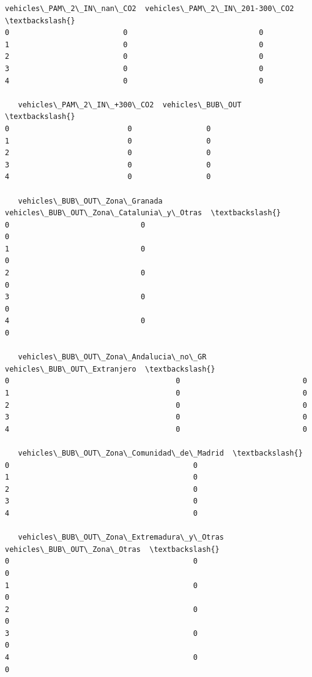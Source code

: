 \documentclass[11pt]{article}
\begin{document}
\begin{tcolorbox}[breakable, size=fbox, boxrule=.5pt, pad at break*=1mm, opacityfill=0]
\begin{Verbatim}[commandchars=\\\{\}]
   vehicles\_PAM\_2\_IN\_nan\_CO2  vehicles\_PAM\_2\_IN\_201-300\_CO2  \textbackslash{}
0                          0                              0
1                          0                              0
2                          0                              0
3                          0                              0
4                          0                              0

   vehicles\_PAM\_2\_IN\_+300\_CO2  vehicles\_BUB\_OUT  \textbackslash{}
0                           0                 0
1                           0                 0
2                           0                 0
3                           0                 0
4                           0                 0

   vehicles\_BUB\_OUT\_Zona\_Granada  vehicles\_BUB\_OUT\_Zona\_Catalunia\_y\_Otras  \textbackslash{}
0                              0                                        0
1                              0                                        0
2                              0                                        0
3                              0                                        0
4                              0                                        0

   vehicles\_BUB\_OUT\_Zona\_Andalucia\_no\_GR  vehicles\_BUB\_OUT\_Extranjero  \textbackslash{}
0                                      0                            0
1                                      0                            0
2                                      0                            0
3                                      0                            0
4                                      0                            0

   vehicles\_BUB\_OUT\_Zona\_Comunidad\_de\_Madrid  \textbackslash{}
0                                          0
1                                          0
2                                          0
3                                          0
4                                          0

   vehicles\_BUB\_OUT\_Zona\_Extremadura\_y\_Otras  vehicles\_BUB\_OUT\_Zona\_Otras  \textbackslash{}
0                                          0                            0
1                                          0                            0
2                                          0                            0
3                                          0                            0
4                                          0                            0


\end{Verbatim}
\end{tcolorbox}
\end{document}
